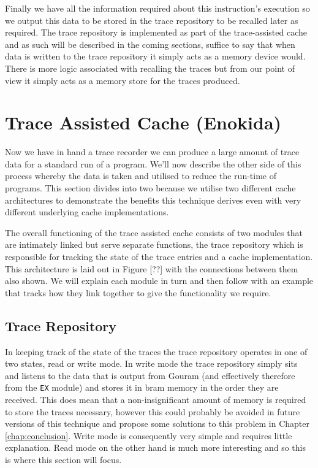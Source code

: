 Finally we have all the information required about this instruction's execution so we output this data to be stored in the trace repository to be recalled later as required. The trace repository is implemented as part of the trace-assisted cache and as such will be described in the coming sections, suffice to say that when data is written to the trace repository it simply acts as a memory device would. There is more logic associated with recalling the traces but from our point of view it simply acts as a memory store for the traces produced.

\section{Trace Assisted Cache (Enokida)}

Now we have in hand a trace recorder we can produce a large amount of trace data for a standard run of a program. We'll now describe the other side of this process whereby the data is taken and utilised to reduce the run-time of programs. This section divides into two because we utilise two different cache architectures to demonstrate the benefits this technique derives even with very different underlying cache implementations. 

The overall functioning of the trace assisted cache consists of two modules that are intimately linked but serve separate functions, the trace repository which is responsible for tracking the state of the trace entries and a cache implementation. This architecture is laid out in Figure [??] with the connections between them also shown. We will explain each module in turn and then follow with an example that tracks how they link together to give the functionality we require.

\subsection{Trace Repository}

In keeping track of the state of the traces the trace repository operates in one of two states, read or write mode. In write mode the trace repository simply sits and listens to the data that is output from Gouram (and effectively therefore from the \texttt{EX} module) and stores it in \gls{bram} memory in the order they are received. This does mean that a non-insignificant amount of memory is required to store the traces necessary, however this could probably be avoided in future versions of this technique and propose some solutions to this problem in Chapter \ref{chap:conclusion}. Write mode is consequently very simple and requires little explanation. Read mode on the other hand is much more interesting and so this is where this section will focus.

